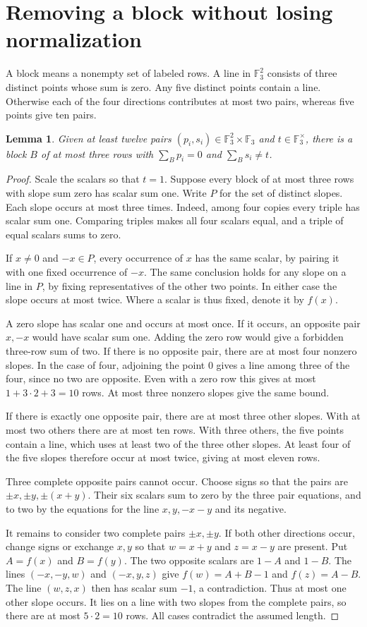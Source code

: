 \documentclass[a4paper,12pt]{article}
\newcommand{\F}{\mathbb F_3}
\newtheorem{lem}[thm]{Lemma}
\begin{document}
\newpage
\section{Removing a block without losing normalization}
A block means a nonempty set of labeled rows. A line in $\F^2$ consists of three distinct points whose sum is zero. Any five distinct points contain a line. Otherwise each of the four directions contributes at most two pairs, whereas five points give ten pairs.
\begin{lem}\label{short}
Given at least twelve pairs $(p_i,s_i)\in\F^2\times\F$ and $t\in\F^\times$, there is a block $B$ of at most three rows with $\sum_B p_i=0$ and $\sum_B s_i\ne t$.
\end{lem}
\begin{proof}
Scale the scalars so that $t=1$. Suppose every block of at most three rows with slope sum zero has scalar sum one. Write $P$ for the set of distinct slopes. Each slope occurs at most three times. Indeed, among four copies every triple has scalar sum one. Comparing triples makes all four scalars equal, and a triple of equal scalars sums to zero.

If $x\ne0$ and $-x\in P$, every occurrence of $x$ has the same scalar, by pairing it with one fixed occurrence of $-x$. The same conclusion holds for any slope on a line in $P$, by fixing representatives of the other two points. In either case the slope occurs at most twice. Where a scalar is thus fixed, denote it by $f(x)$.

A zero slope has scalar one and occurs at most once. If it occurs, an opposite pair $x,-x$ would have scalar sum one. Adding the zero row would give a forbidden three-row sum of two. If there is no opposite pair, there are at most four nonzero slopes. In the case of four, adjoining the point $0$ gives a line among three of the four, since no two are opposite. Even with a zero row this gives at most $1+3\cdot2+3=10$ rows. At most three nonzero slopes give the same bound.

If there is exactly one opposite pair, there are at most three other slopes. With at most two others there are at most ten rows. With three others, the five points contain a line, which uses at least two of the three other slopes. At least four of the five slopes therefore occur at most twice, giving at most eleven rows.

Three complete opposite pairs cannot occur. Choose signs so that the pairs are $\pm x,\pm y,\pm(x+y)$. Their six scalars sum to zero by the three pair equations, and to two by the equations for the line $x,y,-x-y$ and its negative.

It remains to consider two complete pairs $\pm x,\pm y$. If both other directions occur, change signs or exchange $x,y$ so that $w=x+y$ and $z=x-y$ are present. Put $A=f(x)$ and $B=f(y)$. The two opposite scalars are $1-A$ and $1-B$. The lines $(-x,-y,w)$ and $(-x,y,z)$ give $f(w)=A+B-1$ and $f(z)=A-B$. The line $(w,z,x)$ then has scalar sum $-1$, a contradiction. Thus at most one other slope occurs. It lies on a line with two slopes from the complete pairs, so there are at most $5\cdot2=10$ rows. All cases contradict the assumed length.
\end{proof}
\end{document}
